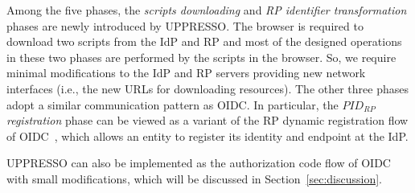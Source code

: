Among the five phases, the {\em scripts downloading} and {\em RP identifier transformation} phases are newly introduced by UPPRESSO. The browser is required to download two scripts from the IdP and RP and most of the designed operations in these two phases are performed by the scripts in the browser. So, we require minimal modifications to the IdP and RP servers providing new network interfaces (i.e., the new URLs for downloading resources). The other three phases adopt a similar communication pattern as OIDC. In particular, the {\em $PID_{RP}$ registration} phase can be viewed as a variant of the RP dynamic registration flow of OIDC~\cite{DynamicRegistration}, which allows an entity to register its identity and endpoint at the IdP.

UPPRESSO can also be implemented as the authorization code flow of OIDC with small modifications, which will be discussed in Section~\ref{sec:discussion}.


